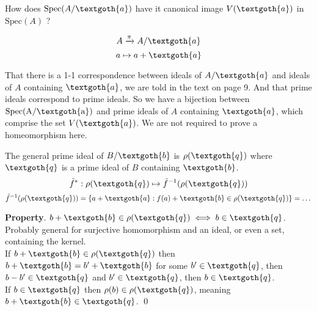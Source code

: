 \documentclass{article}
\begin{document}
How does $\textrm{Spec}(A/\textgoth{a})$ have it canonical image $V(\textgoth{a})$ in $\textrm{Spec}(A)$ ?

\[
  A \xrightarrow{\pi} A/\textgoth{a}
\]
\[
  a \mapsto a + \textgoth{a}
\]

\noindent
That there is a 1-1 correspondence between ideals of $A/\textgoth{a}$ and ideals of $A$ containing $\textgoth{a}$, we are told in the text on page 9. And that prime ideals correspond to prime ideals. So we have a bijection between $\textrm{Spec(A/\textgoth{a})}$ and prime ideals of $A$ containing $\textgoth{a}$, which comprise the set $V(\textgoth{a})$. We are not required to prove a homeomorphism here.

\quad
{}

\noindent
The general prime ideal of $B/\textgoth{b}$ is $\rho(\textgoth{q})$ where $\textgoth{q}$ is a prime ideal of $B$ containing $\textgoth{b}$. 
\[
  \tilde{f}^*: \rho(\textgoth{q}) \mapsto \tilde{f}^{-1}(\rho(\textgoth{q}))
\]
\[
  \tilde{f}^{-1}(\rho(\textgoth{q})) = \{ a + \textgoth{a}: f(a) + \textgoth{b} \in \rho(\textgoth{q}) \} = \dots
\]

\vspace*{10px}

\textbf{Property}. $b + \textgoth{b} \in \rho(\textgoth{q}) \iff b\in \textgoth{q}$. \\

Probably general for surjective homomorphism and an ideal, or even a set, containing the kernel. \\
\noindent
If $b + \textgoth{b} \in \rho(\textgoth{q})$ then $b + \textgoth{b} = b' + \textgoth{b}$ for some $b' \in \textgoth{q}$, then $b - b' \in \textgoth{q}$ and $b' \in \textgoth{q}$, then $b \in \textgoth{q}$. \\ 
If $b \in \textgoth{q}$ then $\rho(b) \in \rho(\textgoth{q})$, meaning $b + \textgoth{b} \in \textgoth{q}$. \qed 
\end{document}
